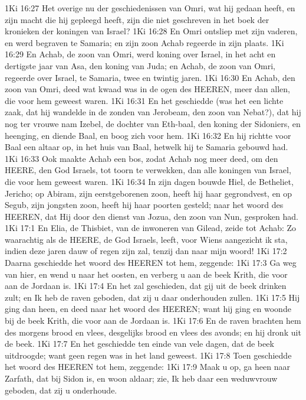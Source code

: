 1Ki 16:27  Het overige nu der geschiedenissen van Omri, wat hij gedaan heeft, en zijn macht die hij gepleegd heeft, zijn die niet geschreven in het boek der kronieken der koningen van Israel?
1Ki 16:28  En Omri ontsliep met zijn vaderen, en werd begraven te Samaria; en zijn zoon Achab regeerde in zijn plaats.
1Ki 16:29  En Achab, de zoon van Omri, werd koning over Israel, in het acht en dertigste jaar van Asa, den koning van Juda; en Achab, de zoon van Omri, regeerde over Israel, te Samaria, twee en twintig jaren.
1Ki 16:30  En Achab, den zoon van Omri, deed wat kwaad was in de ogen des HEEREN, meer dan allen, die voor hem geweest waren.
1Ki 16:31  En het geschiedde (was het een lichte zaak, dat hij wandelde in de zonden van Jerobeam, den zoon van Nebat?), dat hij nog ter vrouwe nam Izebel, de dochter van Eth-baal, den koning der Sidoniers, en heenging, en diende Baal, en boog zich voor hem.
1Ki 16:32  En hij richtte voor Baal een altaar op, in het huis van Baal, hetwelk hij te Samaria gebouwd had.
1Ki 16:33  Ook maakte Achab een bos, zodat Achab nog meer deed, om den HEERE, den God Israels, tot toorn te verwekken, dan alle koningen van Israel, die voor hem geweest waren.
1Ki 16:34  In zijn dagen bouwde Hiel, de Betheliet, Jericho; op Abiram, zijn eerstgeborenen zoon, heeft hij haar gegrondvest, en op Segub, zijn jongsten zoon, heeft hij haar poorten gesteld; naar het woord des HEEREN, dat Hij door den dienst van Jozua, den zoon van Nun, gesproken had.
1Ki 17:1  En Elia, de Thisbiet, van de inwoneren van Gilead, zeide tot Achab: Zo waarachtig als de HEERE, de God Israels, leeft, voor Wiens aangezicht ik sta, indien deze jaren dauw of regen zijn zal, tenzij dan naar mijn woord!
1Ki 17:2  Daarna geschiedde het woord des HEEREN tot hem, zeggende:
1Ki 17:3  Ga weg van hier, en wend u naar het oosten, en verberg u aan de beek Krith, die voor aan de Jordaan is.
1Ki 17:4  En het zal geschieden, dat gij uit de beek drinken zult; en Ik heb de raven geboden, dat zij u daar onderhouden zullen.
1Ki 17:5  Hij ging dan heen, en deed naar het woord des HEEREN; want hij ging en woonde bij de beek Krith, die voor aan de Jordaan is.
1Ki 17:6  En de raven brachten hem des morgens brood en vlees, desgelijks brood en vlees des avonds; en hij dronk uit de beek.
1Ki 17:7  En het geschiedde ten einde van vele dagen, dat de beek uitdroogde; want geen regen was in het land geweest.
1Ki 17:8  Toen geschiedde het woord des HEEREN tot hem, zeggende:
1Ki 17:9  Maak u op, ga heen naar Zarfath, dat bij Sidon is, en woon aldaar; zie, Ik heb daar een weduwvrouw geboden, dat zij u onderhoude.
